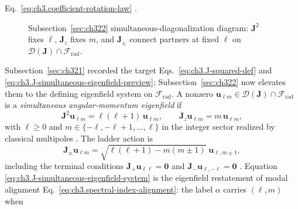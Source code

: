 Eq.~\eqref{eq:ch3.coefficient-rotation-law} .
\begin{figure}[t]
\centering
{}
\caption{Subsection~\ref{sec:ch322} simultaneous-diagonalization diagram: \(\mathbf{J}^{2}\) fixes \(\ell\),
\(\mathbf{J}_{z}\) fixes \(m\), and \(\mathbf{J}_{\pm}\) connect partners at fixed \(\ell\) on
\(\mathcal{D}(\mathbf{J})\cap\mathcal{F}_{\mathrm{rad}}\).}
\label{fig:ch3.J-ladder-simultaneous}
\end{figure}
Subsection~\ref{sec:ch321} recorded the target Eqs.~\eqref{eq:ch3.J-squared-def} and
\eqref{eq:ch3.J-simultaneous-eigenfield-preview}; Subsection~\ref{sec:ch322} now elevates them to the defining
eigenfield system on \(\mathcal{F}_{\mathrm{rad}}\). A nonzero
\(\mathbf{u}_{\ell m}\in\mathcal{D}(\mathbf{J})\cap\mathcal{F}_{\mathrm{rad}}\) is a
\emph{simultaneous angular-momentum eigenfield} if
\begin{equation}
\label{eq:ch3.J-simultaneous-eigenfield-system}
\mathbf{J}^{2}\mathbf{u}_{\ell m}
=
\ell(\ell+1)\,\mathbf{u}_{\ell m},
\qquad
\mathbf{J}_{z}\mathbf{u}_{\ell m}
=
m\,\mathbf{u}_{\ell m},
\end{equation}
with \(\ell\ge 0\) and \(m\in\{-\ell,-\ell+1,\ldots,\ell\}\) in the integer sector realized by classical
multipoles . The ladder action is
\begin{equation}
\label{eq:ch3.J-ladder-action}
\mathbf{J}_{\pm}\mathbf{u}_{\ell m}
=
\sqrt{\ell(\ell+1)-m(m\pm 1)}\;\mathbf{u}_{\ell,m\pm 1},
\end{equation}
including the terminal conditions \(\mathbf{J}_{+}\mathbf{u}_{\ell\ell}=\mathbf{0}\) and
\(\mathbf{J}_{-}\mathbf{u}_{\ell,-\ell}=\mathbf{0}\) . Equation
\eqref{eq:ch3.J-simultaneous-eigenfield-system} is the eigenfield restatement of modal alignment
Eq.~\eqref{eq:ch3.spectral-index-alignment}: the label \(\alpha\) carries \((\ell,m)\) when
